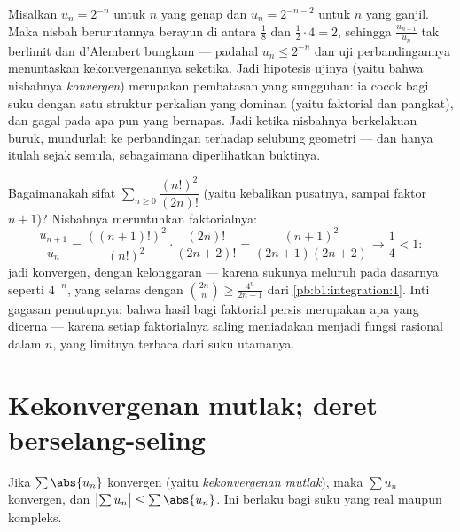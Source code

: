 \begin{example}\label{ex:b1:series:rationotnecessary}
Misalkan $u_n = 2^{-n}$ untuk $n$ yang genap dan $u_n = 2^{-n-2}$ untuk $n$ yang
ganjil. Maka nisbah berurutannya berayun di antara $\frac{1}{8}$ dan
$\frac12\cdot4 = 2$, sehingga $\frac{u_{n+1}}{u_n}$ tak berlimit dan
d'Alembert bungkam --- padahal $u_n \leq 2^{-n}$ dan uji
perbandingannya menuntaskan kekonvergenannya seketika. Jadi hipotesis ujinya (yaitu bahwa
nisbahnya \emph{konvergen}) merupakan pembatasan yang sungguhan: ia cocok bagi suku
dengan satu struktur perkalian yang dominan (yaitu faktorial dan pangkat),
dan gagal pada apa pun yang bernapas. Jadi ketika nisbahnya berkelakuan buruk,
mundurlah ke perbandingan terhadap selubung geometri --- dan hanya itulah
 sejak semula, sebagaimana diperlihatkan buktinya.
\end{example}

\begin{example}\label{ex:b1:series:ratiobinom}
Bagaimanakah sifat $\sum_{n\geq0} \dfrac{(n!)^2}{(2n)!}$ (yaitu kebalikan
 pusatnya, sampai faktor $n + 1$)?
Nisbahnya meruntuhkan faktorialnya:
\[
\frac{u_{n+1}}{u_n}
= \frac{((n+1)!)^2}{(n!)^2}\cdot\frac{(2n)!}{(2n+2)!}
= \frac{(n+1)^2}{(2n+1)(2n+2)}
\longrightarrow \frac14 < 1 :
\]
jadi konvergen, dengan kelonggaran --- karena sukunya meluruh pada dasarnya
seperti $4^{-n}$, yang selaras dengan $\binom{2n}{n} \geq
\frac{4^n}{2n+1}$ dari \cref{pb:b1:integration:1}. Inti gagasan
penutupnya: bahwa hasil bagi faktorial persis merupakan apa yang dicerna 
--- karena setiap faktorialnya saling meniadakan menjadi fungsi rasional dalam
$n$, yang limitnya terbaca dari suku utamanya.
\end{example}

\section{Kekonvergenan mutlak; deret berselang-seling}

\begin{theorem}\label{thm:b1:series:absolute}
Jika $\sum \abs{u_n}$ konvergen (yaitu \emph{kekonvergenan
mutlak}), maka $\sum u_n$ konvergen,
dan $\bigl|\sum u_n\bigr| \leq \sum \abs{u_n}$. Ini berlaku bagi suku yang real
maupun kompleks.
\end{theorem}

